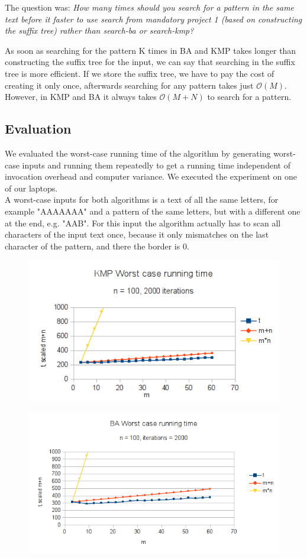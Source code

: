 \documentclass[a4paper,10pt]{article}
\begin{document}
The question was:
\emph{How many times should you search for a pattern in the same text before it faster to use search from mandatory project 1 (based on constructing the suffix tree) rather than search-ba or search-kmp?}

As soon as searching for the pattern K times in BA and KMP takes longer
than constructing the suffix tree for the input, we can say that searching in
the suffix tree is more efficient.
If we store the suffix tree, we have to pay the cost of creating it only once,
afterwards searching for any pattern takes just $\mathcal{O}(M)$.
However, in KMP and BA it always takes $\mathcal{O}(M+N)$ to search for a pattern.


\subsection*{Evaluation}
We evaluated the worst-case running time of the algorithm by generating worst-case inputs and running them repeatedly to get a running time independent of invocation overhead and computer variance. We executed the experiment on one of our laptops.\\

A worst-case inputs for both algorithms is a text of all the same letters, for example "AAAAAAA" and a pattern of the same letters, but with a different one at the end, e.g. "AAB". For this input the algorithm actually has to scan all characters of the input text once, because it only mismatches on the last character of the pattern, and there the border is 0.
\begin{figure}
  \centering
  \includegraphics{./images/eval_kmp.png}
  \label{fig:eval}
\end{figure}

\begin{figure}
  \centering
  \includegraphics{./images/eval_ba - 1.png}
  \label{fig:eval}
\end{figure}
\end{document}
